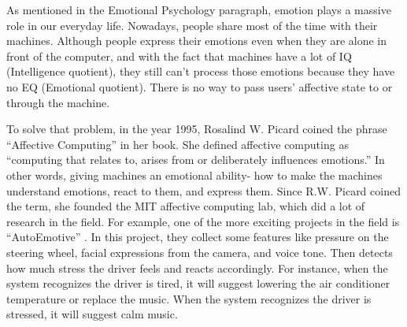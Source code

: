 \documentclass[../main.tex]{subfiles}
\begin{document}
As mentioned in the Emotional Psychology paragraph, emotion plays a massive role in our everyday life.
Nowadays, people share most of the time with their machines. Although people express their emotions 
even when they are alone in front of the computer, and with the fact that machines have a lot of 
IQ (Intelligence quotient), they still can’t process those emotions because they have no EQ (Emotional quotient). 
There is no way to pass users’ affective state to or through the machine.
\par

To solve that problem, in the year 1995, Rosalind W. Picard coined the phrase “Affective Computing” 
in her book\cite{affective_computing_book}. She defined affective computing as “computing that relates to, 
arises from or deliberately influences emotions.” In other words, giving machines an emotional ability- 
how to make the machines understand emotions, react to them, and express them. 
Since R.W. Picard coined the term, she founded the MIT affective computing lab, which did a lot of
research in the field. For example, one of the more exciting
projects in the field is “AutoEmotive” \cite{AutoEmotive}. In this project, they collect 
some features like pressure on the steering wheel, facial expressions from the camera, 
and voice tone. Then detects how much stress the driver feels and reacts accordingly. 
For instance, when the system recognizes the driver is tired, it will suggest lowering the air
conditioner temperature or replace the music. When the system recognizes the driver is stressed, it will
suggest calm music.
\end{document}
